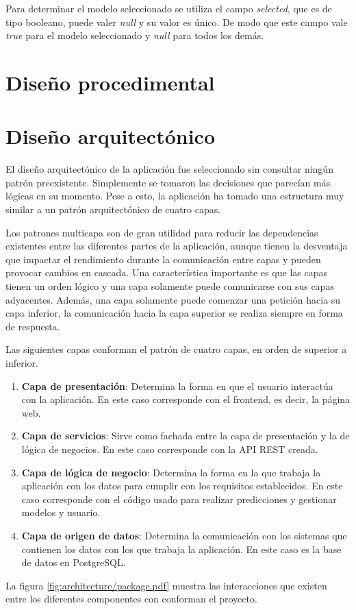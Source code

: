 Para determinar el modelo seleccionado se utiliza el campo \textit{selected},
que es de tipo booleano, puede valer \textit{null} y su valor es único. De modo
que este campo vale \textit{true} para el modelo seleccionado y \textit{null}
para todos los demás.

\section{Diseño procedimental}


\section{Diseño arquitectónico}

El diseño arquitectónico de la aplicación fue seleccionado sin consultar ningún
patrón preexistente. Simplemente se tomaron las decisiones que parecían más
lógicas en su momento. Pese a esto, la aplicación ha tomado una estructura muy
similar a un patrón arquitectónico de cuatro capas.

Los patrones multicapa son de gran utilidad para reducir las dependencias
existentes entre las diferentes partes de la aplicación, aunque tienen la
desventaja que impactar el rendimiento durante la comunicación entre capas y
pueden provocar cambios en cascada. Una característica importante es que las
capas tienen un orden lógico y una capa solamente puede comunicarse con sus
capas adyacentes. Además, una capa solamente puede comenzar una petición hacia
su capa inferior, la comunicación hacia la capa superior se realiza siempre en
forma de respuesta.

Las siguientes capas conforman el patrón de cuatro capas, en orden de superior a
inferior.

\begin{enumerate}
    \item \textbf{Capa de presentación}: Determina la forma en que el usuario
    interactúa con la aplicación. En este caso corresponde con el frontend, es
    decir, la página web.
    \item \textbf{Capa de servicios}: Sirve como fachada entre la capa de
    presentación y la de lógica de negocios. En este caso corresponde con la API
    REST creada.
    \item \textbf{Capa de lógica de negocio}: Determina la forma en la que
    trabaja la aplicación con los datos para cumplir con los requisitos
    establecidos. En este caso corresponde con el código usado para realizar
    predicciones y gestionar modelos y usuario.
    \item \textbf{Capa de origen de datos}: Determina la comunicación con los
    sistemas que contienen los datos con los que trabaja la aplicación. En este
    caso es la base de datos en PostgreSQL.
\end{enumerate}

La figura \ref{fig:architecture/package.pdf} muestra las interacciones que
existen entre los diferentes componentes con conforman el proyecto.


